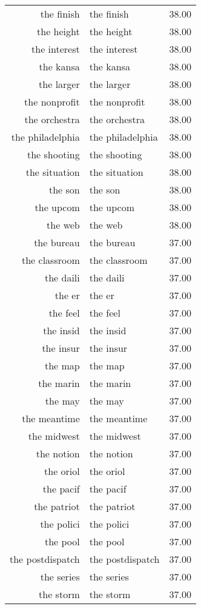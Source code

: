 \begin{table}[ht]
\begin{tabular}{rlr}
  the finish & the finish & 38.00 \\ 
  the height & the height & 38.00 \\ 
  the interest & the interest & 38.00 \\ 
  the kansa & the kansa & 38.00 \\ 
  the larger & the larger & 38.00 \\ 
  the nonprofit & the nonprofit & 38.00 \\ 
  the orchestra & the orchestra & 38.00 \\ 
  the philadelphia & the philadelphia & 38.00 \\ 
  the shooting & the shooting & 38.00 \\ 
  the situation & the situation & 38.00 \\ 
  the son & the son & 38.00 \\ 
  the upcom & the upcom & 38.00 \\ 
  the web & the web & 38.00 \\ 
  the bureau & the bureau & 37.00 \\ 
  the classroom & the classroom & 37.00 \\ 
  the daili & the daili & 37.00 \\ 
  the er & the er & 37.00 \\ 
  the feel & the feel & 37.00 \\ 
  the insid & the insid & 37.00 \\ 
  the insur & the insur & 37.00 \\ 
  the map & the map & 37.00 \\ 
  the marin & the marin & 37.00 \\ 
  the may & the may & 37.00 \\ 
  the meantime & the meantime & 37.00 \\ 
  the midwest & the midwest & 37.00 \\ 
  the notion & the notion & 37.00 \\ 
  the oriol & the oriol & 37.00 \\ 
  the pacif & the pacif & 37.00 \\ 
  the patriot & the patriot & 37.00 \\ 
  the polici & the polici & 37.00 \\ 
  the pool & the pool & 37.00 \\ 
  the postdispatch & the postdispatch & 37.00 \\ 
  the series & the series & 37.00 \\ 
  the storm & the storm & 37.00 \\ 

\end{tabular}
\end{table}
